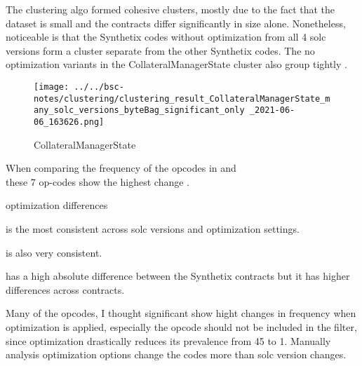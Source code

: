 \documentclass[../main.tex]{subfiles}
\begin{document}
The clustering algo formed cohesive clusters, mostly due to the fact that the dataset is small and the contracts differ significantly in size alone.
Nonetheless, noticeable is that the Synthetix codes without optimization from all 4 solc versions form a cluster separate from the other Synthetix codes. The no optimization variants in the CollateralManagerState cluster also group tightly .

\begin{figure*}[ht!]
  \centering
  \texttt{[image: ../../bsc-notes/clustering/clustering\_result\_CollateralManagerState\_many\_solc\_versions\_byteBag\_significant\_only \_2021-06-06\_163626.png]}
  \caption{CollateralManagerState}
  \label{fig:CollateralManagerState}
\end{figure*}

When comparing the frequency of the opcodes in  and\\
 these 7 op-codes show the highest change .

\begin{table}[ht!]
  \centering
  \caption{optimization differences}
  \label{tbl:opt_diff}
\end{table}

 is the most consistent across solc versions and optimization settings.

 is also very consistent.

 has a high absolute difference between the Synthetix contracts but it has higher differences across contracts.

Many of the opcodes, I thought significant show hight changes in frequency when optimization is applied, especially the  opcode should not be included in the filter, since optimization drastically reduces its prevalence from 45 to 1.
Manually analysis optimization options change the codes more than solc version changes.
\end{document}

